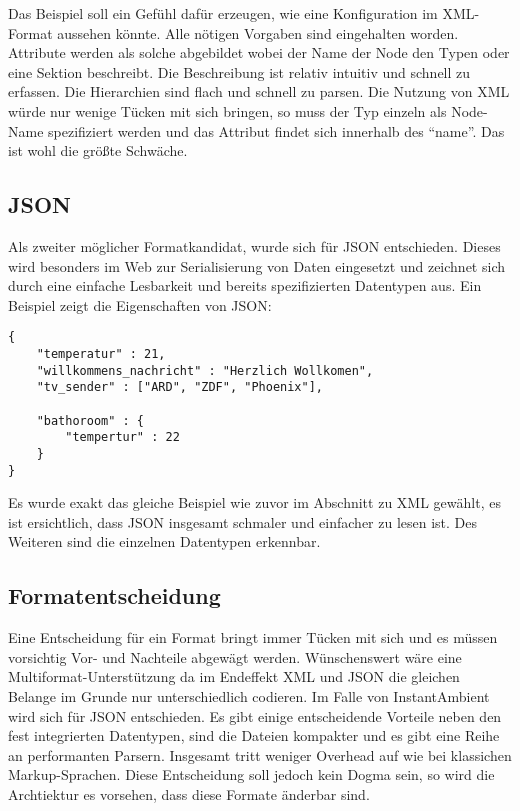 Das Beispiel soll ein Gefühl dafür erzeugen, wie eine Konfiguration im XML-Format aussehen könnte. Alle nötigen Vorgaben sind eingehalten worden. Attribute werden als solche abgebildet wobei der Name der Node den Typen oder eine Sektion beschreibt. Die Beschreibung ist relativ intuitiv und schnell zu erfassen. Die Hierarchien sind flach und schnell zu parsen. Die Nutzung von XML würde nur wenige Tücken mit sich bringen, so muss der Typ einzeln als Node-Name spezifiziert werden und das Attribut findet sich innerhalb des "`name"'. Das ist wohl die größte Schwäche. 

\subsection{JSON}
Als zweiter möglicher Formatkandidat, wurde sich für JSON entschieden. Dieses wird besonders im Web zur Serialisierung von Daten eingesetzt und zeichnet sich durch eine einfache Lesbarkeit und bereits spezifizierten Datentypen aus. Ein Beispiel zeigt die Eigenschaften von JSON:

\lstset{language=bash}
\begin{lstlisting}[caption=JSON-Konfiguration, captionpos=b]
{
	"temperatur" : 21,
	"willkommens_nachricht" : "Herzlich Wollkomen", 
	"tv_sender" : ["ARD", "ZDF", "Phoenix"], 

	"bathoroom" : {
		"tempertur" : 22
	}
}
\end{lstlisting}

Es wurde exakt das gleiche Beispiel wie zuvor im Abschnitt zu XML gewählt, es ist ersichtlich, dass JSON insgesamt schmaler und einfacher zu lesen ist. Des Weiteren sind die einzelnen Datentypen erkennbar.

\subsection{Formatentscheidung}
Eine Entscheidung für ein Format bringt immer Tücken mit sich und es müssen vorsichtig Vor- und Nachteile abgewägt werden. Wünschenswert wäre eine Multiformat-Unterstützung da im Endeffekt XML und JSON die gleichen Belange im Grunde nur unterschiedlich codieren. Im Falle von InstantAmbient wird sich für JSON entschieden. Es gibt einige entscheidende Vorteile neben den fest integrierten Datentypen, sind die Dateien kompakter und es gibt eine Reihe an performanten Parsern. Insgesamt tritt weniger Overhead auf wie bei klassichen Markup-Sprachen. Diese Entscheidung soll jedoch kein Dogma sein, so wird die Archtiektur es vorsehen, dass diese Formate änderbar sind. 

